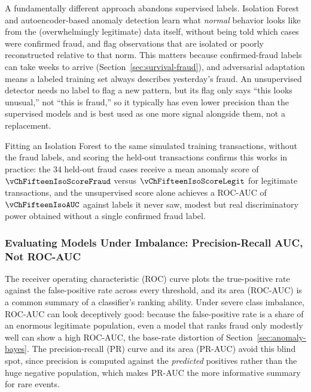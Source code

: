 \documentclass[../ai_in_finance]{subfiles}
\begin{document}
A fundamentally different approach abandons supervised labels. Isolation Forest and autoencoder-based anomaly detection learn what \emph{normal} behavior looks like from the (overwhelmingly legitimate) data itself, without being told which cases were confirmed fraud, and flag observations that are isolated or poorly reconstructed relative to that norm. This matters because confirmed-fraud labels can take weeks to arrive (Section~\ref{sec:survival-fraud}), and adversarial adaptation means a labeled training set always describes yesterday's fraud. An unsupervised detector needs no label to flag a new pattern, but its flag only says ``this looks unusual,'' not ``this is fraud,'' so it typically has even lower precision than the supervised models and is best used as one more signal alongside them, not a replacement.

Fitting an Isolation Forest to the same simulated training transactions, without the fraud labels, and scoring the held-out transactions confirms this works in practice: the 34 held-out fraud cases receive a mean anomaly score of $\vChFifteenIsoScoreFraud$ versus $\vChFifteenIsoScoreLegit$ for legitimate transactions, and the unsupervised score alone achieves a ROC-AUC of $\vChFifteenIsoAUC$ against labels it never saw, modest but real discriminatory power obtained without a single confirmed fraud label.

\subsubsection*{Evaluating Models Under Imbalance: Precision-Recall AUC, Not ROC-AUC}

The receiver operating characteristic (ROC) curve plots the true-positive rate against the false-positive rate across every threshold, and its area (ROC-AUC) is a common summary of a classifier's ranking ability. Under severe class imbalance, ROC-AUC can look deceptively good: because the false-positive rate is a share of an enormous legitimate population, even a model that ranks fraud only modestly well can show a high ROC-AUC, the base-rate distortion of Section~\ref{sec:anomaly-bayes}. The precision-recall (PR) curve and its area (PR-AUC) avoid this blind spot, since precision is computed against the \emph{predicted} positives rather than the huge negative population, which makes PR-AUC the more informative summary for rare events.
\end{document}
